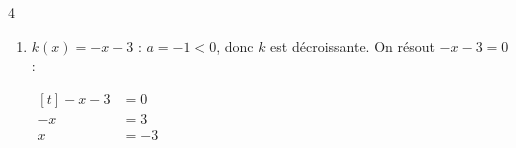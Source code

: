\documentclass[10pt,a4paper]{article}
\begin{document}
\begin{corr}{4}
\begin{enumerate}[label=\alph*)]
    \(\begin{aligned}[t] x+5&=0\\ x&=-5\end{aligned}\)
    \begin{center}
    \end{center}
    \item \(k(x)=-x-3\) : \(a=-1<0\), donc \(k\) est décroissante. On résout \(-x-3=0\) :

    \(\begin{aligned}[t] -x-3&=0\\ -x&=3\\ x&=-3\end{aligned}\)
    \begin{center}
    \end{center}
\end{enumerate}
\end{corr}
\end{document}
